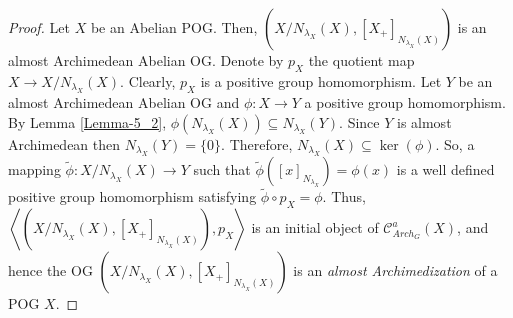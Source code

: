 \documentclass[10pt]{article}
\begin{document}
\begin{proof}
Let $X$ be an Abelian POG. Then, $(X/N_{\lambda_X}(X),[X_+]_{N_{\lambda_X}(X)})$ is an almost Archimedean Abelian OG. 
Denote by $p_X$ the quotient map $X\to X/N_{\lambda_X}(X)$. Clearly, $p_X$ is a positive group homomorphism.
Let $Y$ be an almost Archimedean Abelian OG and $\phi:X\to Y$ a positive group homomorphism. By Lemma \ref{Lemma-5_2}, 
$\phi(N_{\lambda_X}(X))\subseteq N_{\lambda_X}(Y)$. Since $Y$ is almost Archimedean then $N_{\lambda_X}(Y)=\{0\}$.
Therefore, $N_{\lambda_X}(X)\subseteq\ker(\phi)$. So, a mapping $\tilde{\phi}:X/N_{\lambda_X}(X)\to Y$ 
such that $\tilde{\phi}([x]_{N_{\lambda_X}})=\phi(x)$ is a well defined positive group homomorphism satisfying $\tilde{\phi}\circ p_X=\phi$. 
Thus, $\left\langle(X/N_{\lambda_X}(X),[X_+]_{N_{\lambda_X}(X)}),p_X\right\rangle$ is an initial object of $\mathcal{C}^a_{Arch_G}(X)$,
and hence the OG $(X/N_{\lambda_X}(X),[X_+]_{N_{\lambda_X}(X)})$ is an {\em almost Archimedization} of a POG $X$.
\end{proof}

\end{document}
